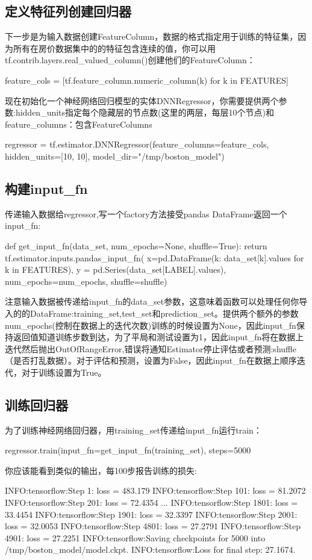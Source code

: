\subsection{定义特征列创建回归器}
下一步是为输入数据创建FeatureColumn，数据的格式指定用于训练的特征集，因为所有在房价数据集中的的特征包含连续的值，你可以用tf.contrib.layers.real\_valued\_column()创建他们的FeatureColumn：
\begin{python}
feature_cols = [tf.feature_column.numeric_column(k) for k in FEATURES]
\end{python}
现在初始化一个神经网络回归模型的实体DNNRegressor，你需要提供两个参数:hidden\_units指定每个隐藏层的节点数(这里的两层，每层10个节点)和feature\_columns：包含FeatureColumns
\begin{python}
regressor = tf.estimator.DNNRegressor(feature_columns=feature_cols,
                                      hidden_units=[10, 10],
                                      model_dir="/tmp/boston_model")
\end{python}
\subsection{构建input\_fn}
传递输入数据给regressor,写一个factory方法接受pandas DataFrame返回一个input\_fn:
\begin{python}
def get_input_fn(data_set, num_epochs=None, shuffle=True):
  return tf.estimator.inputs.pandas_input_fn(
      x=pd.DataFrame({k: data_set[k].values for k in FEATURES}),
      y = pd.Series(data_set[LABEL].values),
      num_epochs=num_epochs,
      shuffle=shuffle)
\end{python}
注意输入数据被传递给input\_fn的data\_set参数，这意味着函数可以处理任何你导入的的DataFrame:training\_set,test\_set和prediction\_set。提供两个额外的参数num\_epochs(控制在数据上的迭代次数)训练的时候设置为None，因此input\_fn保持返回值知道训练步数到达，为了平局和测试设置为1，因此input\_fn将在数据上迭代然后抛出OutOfRangeError,错误将通知Estimator停止评估或者预测:shuffle（是否打乱数据）。对于评估和预测，设置为False，因此input\_fn在数据上顺序迭代，对于训练设置为True。
\subsection{训练回归器}
为了训练神经网络回归器，用training\_set传递给input\_fn运行train：
\begin{python}
regressor.train(input_fn=get_input_fn(training_set), steps=5000
\end{python}
你应该能看到类似的输出，每100步报告训练的损失:
\begin{python}
INFO:tensorflow:Step 1: loss = 483.179
INFO:tensorflow:Step 101: loss = 81.2072
INFO:tensorflow:Step 201: loss = 72.4354
...
INFO:tensorflow:Step 1801: loss = 33.4454
INFO:tensorflow:Step 1901: loss = 32.3397
INFO:tensorflow:Step 2001: loss = 32.0053
INFO:tensorflow:Step 4801: loss = 27.2791
INFO:tensorflow:Step 4901: loss = 27.2251
INFO:tensorflow:Saving checkpoints for 5000 into /tmp/boston_model/model.ckpt.
INFO:tensorflow:Loss for final step: 27.1674.
\end{python}
